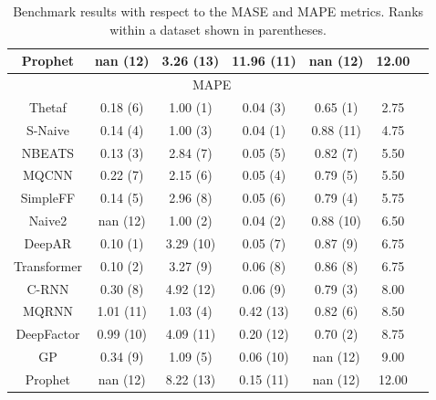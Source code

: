 \begin{table}[htb]
\begin{tabular}{ccccccc}
        Prophet     & nan (12)              & 3.26 (13)              & 11.96 (11)         & nan (12)     & 12.00               \\\hline
        \multicolumn{6}{c}{\cellcolor{gray!25}MAPE}                                                                            \\
        \hline
        Thetaf      & 0.18 (6)              & 1.00 (1)               & 0.04 (3)           & 0.65 (1)     & 2.75                \\\hline
        S-Naive     & 0.14 (4)              & 1.00 (3)               & 0.04 (1)           & 0.88 (11)    & 4.75                \\\hline
        NBEATS      & 0.13 (3)              & 2.84 (7)               & 0.05 (5)           & 0.82 (7)     & 5.50                \\\hline
        MQCNN       & 0.22 (7)              & 2.15 (6)               & 0.05 (4)           & 0.79 (5)     & 5.50                \\\hline
        SimpleFF    & 0.14 (5)              & 2.96 (8)               & 0.05 (6)           & 0.79 (4)     & 5.75                \\\hline
        Naive2      & nan (12)              & 1.00 (2)               & 0.04 (2)           & 0.88 (10)    & 6.50                \\\hline
        DeepAR      & 0.10 (1)              & 3.29 (10)              & 0.05 (7)           & 0.87 (9)     & 6.75                \\\hline
        Transformer & 0.10 (2)              & 3.27 (9)               & 0.06 (8)           & 0.86 (8)     & 6.75                \\\hline
        C-RNN       & 0.30 (8)              & 4.92 (12)              & 0.06 (9)           & 0.79 (3)     & 8.00                \\\hline
        MQRNN       & 1.01 (11)             & 1.03 (4)               & 0.42 (13)          & 0.82 (6)     & 8.50                \\\hline
        DeepFactor  & 0.99 (10)             & 4.09 (11)              & 0.20 (12)          & 0.70 (2)     & 8.75                \\\hline
        GP          & 0.34 (9)              & 1.09 (5)               & 0.06 (10)          & nan (12)     & 9.00                \\\hline
        Prophet     & nan (12)              & 8.22 (13)              & 0.15 (11)          & nan (12)     & 12.00               \\\hline
    \end{tabular}
    \caption{Benchmark results with respect to the MASE and MAPE metrics. Ranks within a dataset shown in parentheses.}
    \label{tab:benchmark_results_MASE_MAPE}
\end{table}

